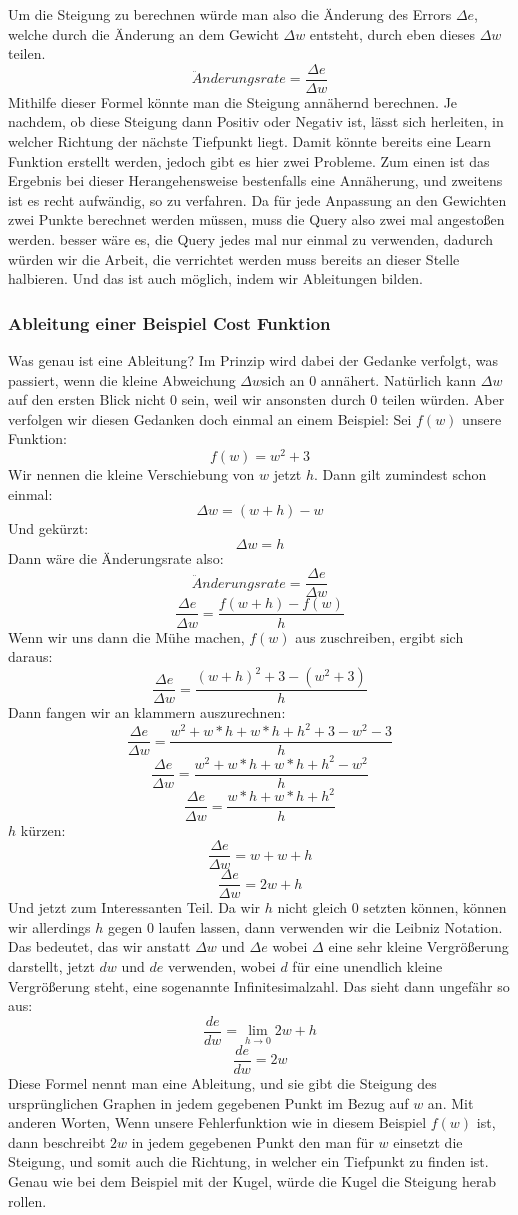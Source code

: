 \documentclass[12pt]{article}
\begin{document}
Um die Steigung zu berechnen würde man also die Änderung des Errors $\Delta e$, welche durch die Änderung an dem Gewicht $\Delta w$ entsteht, durch eben dieses $\Delta w$ teilen. $$\ddot{A}nderungsrate = \frac{\Delta e}{\Delta w}$$
Mithilfe dieser Formel könnte man die Steigung annähernd berechnen. Je nachdem, ob diese Steigung dann Positiv oder Negativ ist, lässt sich herleiten, in welcher Richtung der nächste Tiefpunkt liegt. Damit könnte bereits eine Learn Funktion erstellt werden, jedoch gibt es hier zwei Probleme.
Zum einen ist das Ergebnis bei dieser Herangehensweise bestenfalls eine Annäherung, und zweitens ist es recht aufwändig, so zu verfahren. Da für jede Anpassung an den Gewichten zwei Punkte berechnet werden müssen, muss die Query also zwei mal angestoßen werden. besser wäre es, die Query jedes mal nur einmal zu verwenden, dadurch würden wir die Arbeit, die verrichtet werden muss bereits an dieser Stelle halbieren. Und das ist auch möglich, indem wir Ableitungen bilden.
\subsubsection{Ableitung einer Beispiel Cost Funktion}
Was genau ist eine Ableitung? Im Prinzip wird dabei der Gedanke verfolgt, was passiert, wenn die kleine Abweichung $\Delta w$sich an 0 annähert. Natürlich kann $\Delta w$auf den ersten Blick nicht 0 sein, weil wir ansonsten durch 0 teilen würden. 
Aber verfolgen wir diesen Gedanken doch einmal an einem Beispiel:
Sei $f(w)$ unsere Funktion: $$f(w)=w^2+3$$
Wir nennen die kleine Verschiebung von $w$ jetzt $h$.
Dann gilt zumindest schon einmal: $$\Delta w=(w+h)-w$$Und gekürzt:$$\Delta w=h$$
Dann wäre die Änderungsrate also:$$\ddot{A}nderungsrate = \frac{\Delta e}{\Delta w}$$ $$\frac{\Delta e}{\Delta w}=\frac{f(w+h)-f(w)}{h}$$
Wenn wir uns dann die Mühe machen, $f(w)$ aus zuschreiben, ergibt sich daraus:
$$\frac{\Delta e}{\Delta w}=\frac{(w+h)^2+3-(w^2+3)}{h}$$
Dann fangen wir an klammern auszurechnen:
$$\frac{\Delta e}{\Delta w}=\frac{w^2+w*h+w*h+h^2+3-w^2-3}{h}$$
$$\frac{\Delta e}{\Delta w}=\frac{w^2+w*h+w*h+h^2-w^2}{h}$$
$$\frac{\Delta e}{\Delta w}=\frac{w*h+w*h+h^2}{h}$$
$h$ kürzen:
$$\frac{\Delta e}{\Delta w}=w+w+h$$
$$\frac{\Delta e}{\Delta w}=2w+h$$Und jetzt zum Interessanten Teil. Da wir $h$ nicht gleich 0 setzten können, können wir allerdings $h$ gegen 0 laufen lassen, dann verwenden wir die Leibniz Notation. Das bedeutet, das wir anstatt  $\Delta w$ und  $\Delta e$ wobei $\Delta$ eine sehr kleine Vergrößerung darstellt, jetzt $dw$ und $de$ verwenden, wobei $d$ für eine unendlich kleine Vergrößerung steht, eine sogenannte Infinitesimalzahl.
Das sieht dann ungefähr so aus:
$$\frac{de}{dw}=\lim_{h\to 0} 2w +h$$
$$\frac{de}{dw}=2w$$
Diese Formel nennt man eine Ableitung, und sie gibt die Steigung des ursprünglichen Graphen in jedem gegebenen Punkt im Bezug auf $w$ an. Mit anderen Worten, Wenn unsere Fehlerfunktion wie in diesem Beispiel $f(w)$ ist, dann beschreibt $2w$ in jedem gegebenen Punkt den man für $w$ einsetzt die Steigung, und somit auch die Richtung, in welcher ein Tiefpunkt zu finden ist. Genau wie bei dem Beispiel mit der Kugel, würde die Kugel die Steigung herab rollen.
\end{document}
